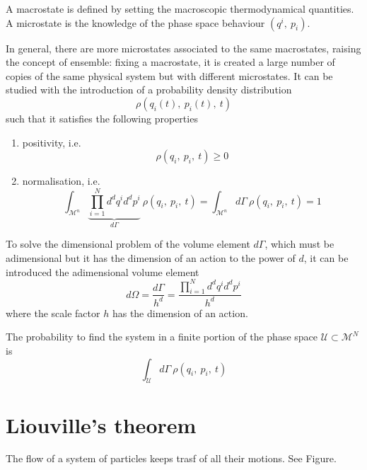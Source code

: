     A macrostate is defined by setting the macroscopic thermodynamical quantities. A microstate is the knowledge of the phase space behaviour $(q^i, ~p_i)$. 

    In general, there are more microstates associated to the same macrostates, raising the concept of ensemble: fixing a macrostate, it is created a large number of copies of the same physical system but with different microstates. It can be studied with the introduction of a probability density distribution 
    \begin{equation*}
        \rho(q_i(t), ~p_i(t),~t)
    \end{equation*}
    such that it satisfies the following properties
    \begin{enumerate}
        \item positivity, i.e.
        \begin{equation*}
            \rho(q_i, ~p_i, ~t) \geq 0
        \end{equation*}
        \item normalisation, i.e.
        \begin{equation*}
            \int_{\mathcal M^n} \underbrace{\prod_{i=1}^N d^d q^i d^d p^i}_{d\Gamma} ~ \rho(q_i, ~p_i, ~t) = \int_{\mathcal M^n} d\Gamma ~ \rho(q_i, ~p_i, ~t) = 1
        \end{equation*}
    \end{enumerate}

    To solve the dimensional problem of the volume element $d\Gamma$, which must be adimensional but it has the dimension of an action to the power of $d$, it can be introduced the adimensional volume element 
    \begin{equation*}
        d \Omega = \frac{d\Gamma}{h^d} = \frac{\prod_{i=1}^N d^d q^i d^d p^i}{h^d}
    \end{equation*}
    where the scale factor $h$ has the dimension of an action.

    The probability to find the system in a finite portion of the phase space $\mathcal U \subset \mathcal M^N$ is 
    \begin{equation*}
        \int_{\mathcal U} d\Gamma ~ \rho(q_i, ~p_i, ~t) 
    \end{equation*}

\section{Liouville's theorem}

    The flow of a system of particles keeps trasf of all their motions. See Figure.

